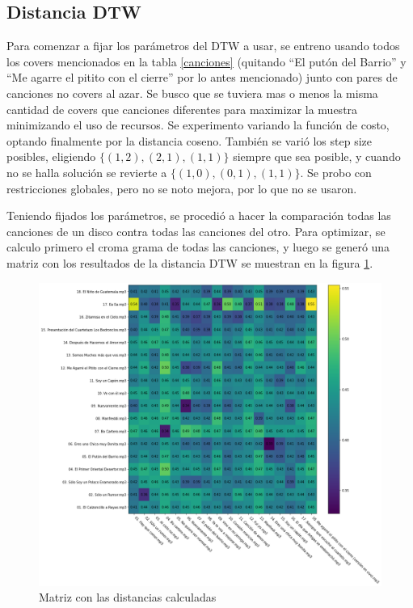 \documentclass{article}
\begin{document}
\subsection{Distancia DTW}

Para comenzar a fijar los parámetros del DTW a usar, se entreno usando todos los covers mencionados en la tabla \ref{canciones} (quitando ``El putón del Barrio'' y ``Me agarre el pitito con el cierre'' por lo antes mencionado) junto con pares de canciones no covers al azar. Se busco que se tuviera mas o menos la misma cantidad de covers que canciones diferentes para maximizar la muestra minimizando el uso de recursos. Se experimento variando la función de costo, optando finalmente por la distancia coseno. También se varió los step size posibles, eligiendo $\{ (1,2), (2,1), (1,1) \}$ siempre que sea posible, y cuando no se halla solución se revierte a $\{(1,0), (0,1), (1,1)\}$. Se probo con restricciones globales, pero no se noto mejora, por lo que no se usaron.

Teniendo fijados los parámetros, se procedió a hacer la comparación todas las canciones de un disco contra todas las canciones del otro. Para optimizar, se calculo primero el croma grama de todas las canciones, y luego se generó una matriz con los resultados de la distancia DTW se muestran en la figura \ref{fig:distancias_allvall}. 

\begin{figure}[!htb]
    \centering
    \includegraphics[width=\textwidth]{dtws/matrix_all_vs_all.png}
    \caption{Matriz con las distancias calculadas}
    \label{fig:distancias_allvall}
\end{figure}
\end{document}
